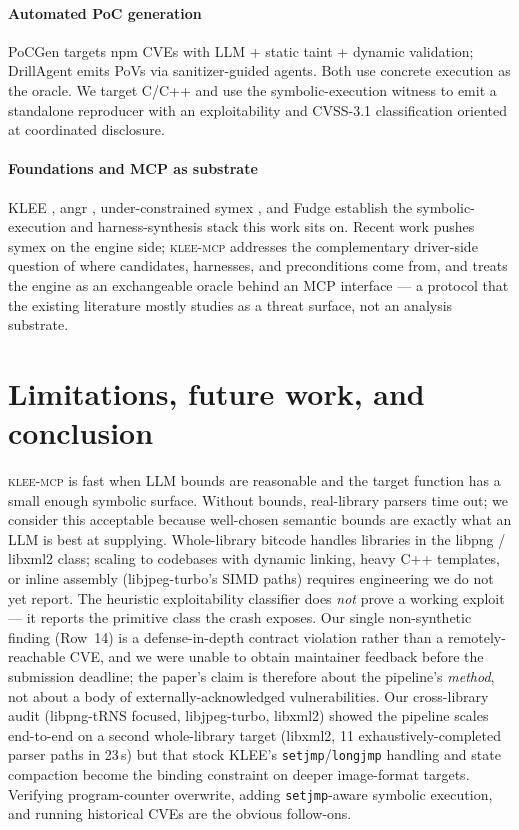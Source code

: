 \documentclass[3p,times,procedia]{elsarticle}
\begin{document}
\paragraph{Automated PoC generation} PoCGen \cite{pocgen} targets npm CVEs with LLM + static taint + dynamic validation; DrillAgent \cite{drillagent} emits PoVs via sanitizer-guided agents. Both use concrete execution as the oracle. We target C/C++ and use the symbolic-execution witness to emit a standalone reproducer with an exploitability and CVSS-3.1 classification oriented at coordinated disclosure.

\paragraph{Foundations and MCP as substrate} KLEE \cite{klee}, angr \cite{angr}, under-constrained symex \cite{ucklee}, and Fudge \cite{fudge} establish the symbolic-execution and harness-synthesis stack this work sits on. Recent work \cite{scherb-divconq,scherb-cps} pushes symex on the engine side; \textsc{klee-mcp} addresses the complementary driver-side question of where candidates, harnesses, and preconditions come from, and treats the engine as an exchangeable oracle behind an MCP \cite{mcp} interface --- a protocol that the existing literature mostly studies as a threat surface, not an analysis substrate.

\section{Limitations, future work, and conclusion}
\label{sec:limits}

\textsc{klee-mcp} is fast when LLM bounds are reasonable and the target function has a small enough symbolic surface. Without bounds, real-library parsers time out; we consider this acceptable because well-chosen semantic bounds are exactly what an LLM is best at supplying. Whole-library bitcode handles libraries in the libpng / libxml2 class; scaling to codebases with dynamic linking, heavy C++ templates, or inline assembly (libjpeg-turbo's SIMD paths) requires engineering we do not yet report. The heuristic exploitability classifier does \emph{not} prove a working exploit --- it reports the primitive class the crash exposes. Our single non-synthetic finding (Row~14) is a defense-in-depth contract violation rather than a remotely-reachable CVE, and we were unable to obtain maintainer feedback before the submission deadline; the paper's claim is therefore about the pipeline's \emph{method}, not about a body of externally-acknowledged vulnerabilities. Our cross-library audit (libpng-tRNS focused, libjpeg-turbo, libxml2) showed the pipeline scales end-to-end on a second whole-library target (libxml2, 11 exhaustively-completed parser paths in 23\,s) but that stock KLEE's \texttt{setjmp}/\texttt{longjmp} handling and state compaction become the binding constraint on deeper image-format targets. Verifying program-counter overwrite, adding \texttt{setjmp}-aware symbolic execution, and running historical CVEs are the obvious follow-ons.
\end{document}
